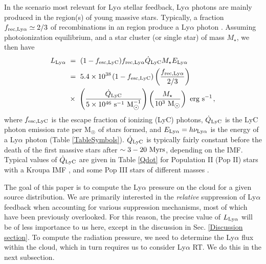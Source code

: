 \documentclass[fleqn,usenatbib]{mnras}
\newcommand\Msun{\text{M}_{\astrosun}} %
\newcommand\HII{\ion{H}{II}\xspace} %
\begin{document}
In the scenario most relevant for Ly$\alpha$ stellar feedback, Ly$\alpha$ photons are mainly produced in the \HII region(s) of young massive stars. Typically, a fraction $f_{\rm rec, Ly\alpha} \simeq 2/3$ of recombinations in an \HII region produce a Ly$\alpha$ photon \citep[e.g.][]{Draine2011, Dijkstra2014}. Assuming photoionization equilibrium, and a star cluster (or single star) of mass $M_{\star}$, we then have 
\begin{align}
    L_{\rm Ly\alpha} ~&=~ (1 - f_{\rm esc,LyC})f_{\rm rec, Ly\alpha} \Dot{Q}_{\rm LyC} M_{\star} E_{\rm Ly\alpha} \nonumber \\ ~&=~ 5.4 \times 10^{38} \hspace{1 pt} (1 - f_{\rm esc,LyC}) \left( \dfrac{f_{\rm rec, Ly\alpha}}{2/3} \right) \nonumber \\ ~&\times~ \left( \dfrac{\Dot{Q}_{\rm LyC}}{5 \times 10^{46}~ \textrm{s}^{-1} ~ \Msun^{-1}} \right) \left( \dfrac{M_{\star}}{10^3 ~\Msun} \right) ~ \textrm{erg s}^{-1} \hspace{1 pt} \label{Lya luminosity},
\end{align}
where $f_{\rm esc,LyC}$ is the escape fraction of ionizing (LyC) photons, $\Dot{Q}_{\rm LyC}$ is the LyC photon emission rate per $\Msun$ of stars formed, and $E_{\rm Ly\alpha} = h\nu_{\rm Ly\alpha}$ is the energy of a Ly$\alpha$ photon (Table \ref{TableSymbols}). $\Dot{Q}_{\rm LyC}$ is typically fairly constant before the death of the first massive stars after $\sim 3 - 20 ~ \rm Myrs$, depending on the IMF. Typical values of $\Dot{Q}_{\rm LyC}$ are given in Table \ref{Qdot} for Population II (Pop II) stars with a Kroupa IMF \citep{Kroupa2001}, and some Pop III stars of different masses \citep[adopted from][]{Klessen2023}. 

The goal of this paper is to compute the Ly$\alpha$ pressure on the cloud for a given source distribution. We are primarily interested in the \textit{relative} suppression of Ly$\alpha$ feedback when accounting for various suppression mechanisms, most of which have been previously overlooked. For this reason, the precise value of $L_{\rm Ly\alpha}$ will be of less importance to us here, except in the discussion in Sec. \ref{Discussion section}. To compute the radiation pressure, we need to determine the Ly$\alpha$ flux within the cloud, which in turn requires us to consider Ly$\alpha$ RT. We do this in the next subsection.
\end{document}
